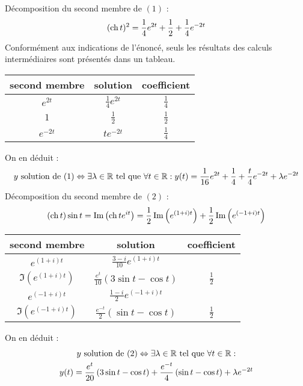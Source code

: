 Décomposition du second membre de $(1)$ :
\begin{displaymath}
 (\operatorname{ch} t)^2 = \frac{1}{4}e^{2t} + \frac{1}{2} + \frac{1}{4}e^{-2t}   
\end{displaymath}
Conformément aux indications de l'énoncé, seuls les résultats des calculs intermédiaires sont présentés dans un tableau.
 \begin{center}
\renewcommand{\arraystretch}{1.7}
\begin{tabular}{|c|c|c|} \hline
second membre & solution           & coefficient   \\ \hline
$e^{2t}$      & $\frac{1}{4}e^{2t}$& $\frac{1}{4}$ \\ \hline
$1$           & $\frac{1}{2}$      & $\frac{1}{2}$ \\ \hline
$e^{-2t}$     & $te^{-2t}$         & $\frac{1}{4}$ \\ \hline
 \end{tabular}
\end{center}
On en déduit :
\begin{displaymath}
 y\text{ solution de }(1)\Leftrightarrow
\exists \lambda\in \mathbb{R} \text{ tel que } \forall t\in \mathbb{R} :
y(t) = \frac{1}{16}e^{2t} + \frac{1}{4} + \frac{t}{4}e^{-2t} + \lambda e^{-2t}
\end{displaymath}
Décomposition du second membre de $(2)$ :
\begin{displaymath}
 (\operatorname{ch} t)\sin t = \operatorname{Im}\left( \operatorname{ch} t e^{it}\right) = \frac{1}{2}\operatorname{Im}\left(e^{(1+i)t}\right) + \frac{1}{2}\operatorname{Im}\left(e^{(-1+i)t}\right)   
\end{displaymath}
 \begin{center}
\renewcommand{\arraystretch}{1.7}
\begin{tabular}{|c|c|c|} \hline
second membre                 & solution           & coefficient   \\ \hline
$e^{(1+i)t}$                  & $\frac{3-i}{10}e^{(1+i)t}$&  \\ \hline
$\Im\left( e^{(1+i)t}\right)$ & $\frac{e^t}{10}\left(3\sin t -\cos t\right)$      & $\frac{1}{2}$ \\ \hline
$e^{(-1+i)t}$                 & $\frac{1-i}{2}e^{(-1+i)t}$         &  \\ \hline
$\Im\left( e^{(-1+i)t}\right)$& $\frac{e^{-t}}{2}\left(\sin t -\cos t\right)$ & $\frac{1}{2}$ \\ \hline
 \end{tabular}
\end{center}
On en déduit :
\begin{multline*}
 y\text{ solution de }(2)\Leftrightarrow
\exists \lambda\in \mathbb{R} \text{ tel que } \forall t\in \mathbb{R} : \\
y(t) = \frac{e^t}{20}\left(3\sin t - \cos t\right) 
      + \frac{e^{-t}}{4}\left(\sin t - \cos t\right)+ \lambda e^{-2t}
\end{multline*}
